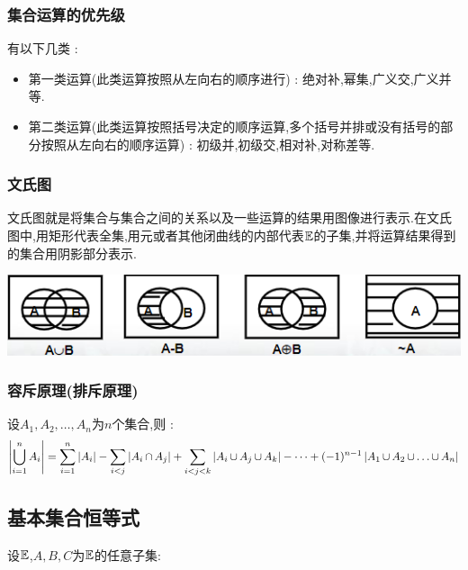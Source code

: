 {{{  \subsubsection{集合运算的优先级}{
    有以下几类 :

    \begin{itemize}
      \item 第一类运算(此类运算按照从左向右的顺序进行) : 绝对补,幂集,广义交,广义并等.
      \item 第二类运算(此类运算按照括号决定的顺序运算,多个括号并排或没有括号的部分按照从左向右的顺序运算) : 初级并,初级交,相对补,对称差等.
    \end{itemize}
  }%

  \subsubsection{文氏图}{
    文氏图就是将集合与集合之间的关系以及一些运算的结果用图像进行表示.在文氏图中,用矩形代表全集,用元或者其他闭曲线的内部代表$\mathEverythingCollection$的子集,并将运算结果得到的集合用阴影部分表示.

    \begin{center}
      \includegraphics{resources/Venn's_diagram.png}
    \end{center}
  }%

  \subsubsection{容斥原理(排斥原理)}{
    设$A_1,A_2,\dots,A_n$为$n$个集合,则 : $$
      \absoluteValue{\updownUnion{n}{i = 1}A_i} = \upDownSum{n}{i = 1}\absoluteValue{A_i} - \upDownSum{\ }{i < j}\absoluteValue{A_i \intersectionSet A_j} + \upDownSum{\ }{i < j < k}\absoluteValue{A_i \unionSet A_j \unionSet A_k} - \dots + (-1)^{n - 1}\absoluteValue{A_1 \unionSet A_2 \unionSet \dots \unionSet A_n}
    $$
  }%

}%

\subsection{基本集合恒等式}{
  设$\mathEverythingCollection$,$A,B,C$为$\mathEverythingCollection$的任意子集:

}}}
